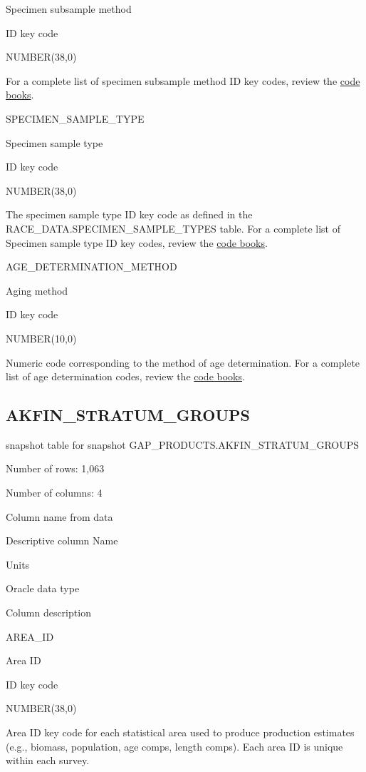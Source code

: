 \documentclass[
  letterpaper,
  oneside,
  open=any]{scrbook}
\begin{document}
Specimen subsample method

ID key code

NUMBER(38,0)

For a complete list of specimen subsample method ID key codes, review
the
\href{https://www.fisheries.noaa.gov/resource/document/groundfish-survey-species-code-manual-and-data-codes-manual}{code
books}.

SPECIMEN\_SAMPLE\_TYPE

Specimen sample type

ID key code

NUMBER(38,0)

The specimen sample type ID key code as defined in the
RACE\_DATA.SPECIMEN\_SAMPLE\_TYPES table. For a complete list of
Specimen sample type ID key codes, review the
\href{https://www.fisheries.noaa.gov/resource/document/groundfish-survey-species-code-manual-and-data-codes-manual}{code
books}.

AGE\_DETERMINATION\_METHOD

Aging method

ID key code

NUMBER(10,0)

Numeric code corresponding to the method of age determination. For a
complete list of age determination codes, review the
\href{https://www.fisheries.noaa.gov/resource/document/groundfish-survey-species-code-manual-and-data-codes-manual}{code
books}.

\subsection{AKFIN\_STRATUM\_GROUPS}\label{akfin_stratum_groups}

snapshot table for snapshot GAP\_PRODUCTS.AKFIN\_STRATUM\_GROUPS

Number of rows: 1,063

Number of columns: 4

Column name from data

Descriptive column Name

Units

Oracle data type

Column description

AREA\_ID

Area ID

ID key code

NUMBER(38,0)

Area ID key code for each statistical area used to produce production
estimates (e.g., biomass, population, age comps, length comps). Each
area ID is unique within each survey.
\end{document}
